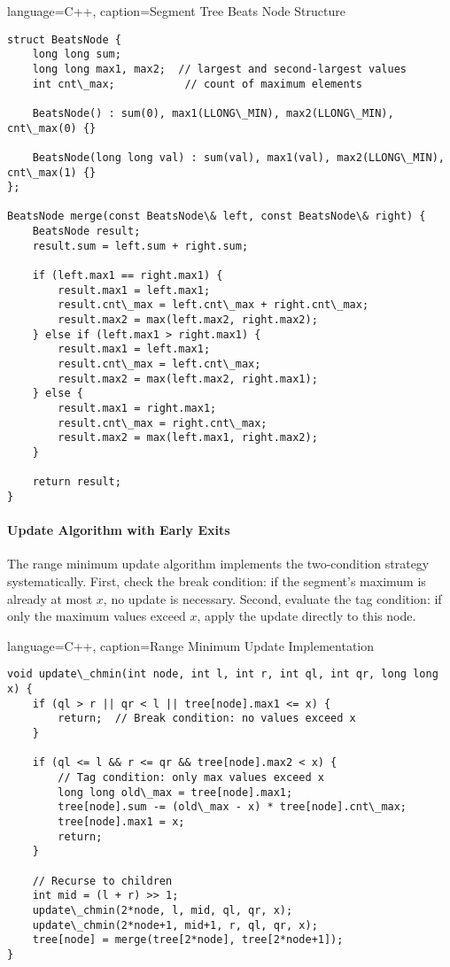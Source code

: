 \begin{marginlisting}[0pt]{language=C++, caption=Segment Tree Beats Node Structure}
\begin{lstlisting}
struct BeatsNode {
    long long sum;
    long long max1, max2;  // largest and second-largest values
    int cnt\_max;           // count of maximum elements
    
    BeatsNode() : sum(0), max1(LLONG\_MIN), max2(LLONG\_MIN), cnt\_max(0) {}
    
    BeatsNode(long long val) : sum(val), max1(val), max2(LLONG\_MIN), cnt\_max(1) {}
};

BeatsNode merge(const BeatsNode\& left, const BeatsNode\& right) {
    BeatsNode result;
    result.sum = left.sum + right.sum;
    
    if (left.max1 == right.max1) {
        result.max1 = left.max1;
        result.cnt\_max = left.cnt\_max + right.cnt\_max;
        result.max2 = max(left.max2, right.max2);
    } else if (left.max1 > right.max1) {
        result.max1 = left.max1;
        result.cnt\_max = left.cnt\_max;
        result.max2 = max(left.max2, right.max1);
    } else {
        result.max1 = right.max1;
        result.cnt\_max = right.cnt\_max;
        result.max2 = max(left.max1, right.max2);
    }
    
    return result;
}
\end{lstlisting}
\end{marginlisting}

\paragraph{Update Algorithm with Early Exits}

The range minimum update algorithm implements the two-condition strategy systematically. First, check the break condition: if the segment's maximum is already at most $x$, no update is necessary. Second, evaluate the tag condition: if only the maximum values exceed $x$, apply the update directly to this node.

\begin{marginlisting}[0pt]{language=C++, caption=Range Minimum Update Implementation}
\begin{lstlisting}
void update\_chmin(int node, int l, int r, int ql, int qr, long long x) {
    if (ql > r || qr < l || tree[node].max1 <= x) {
        return;  // Break condition: no values exceed x
    }
    
    if (ql <= l && r <= qr && tree[node].max2 < x) {
        // Tag condition: only max values exceed x
        long long old\_max = tree[node].max1;
        tree[node].sum -= (old\_max - x) * tree[node].cnt\_max;
        tree[node].max1 = x;
        return;
    }
    
    // Recurse to children
    int mid = (l + r) >> 1;
    update\_chmin(2*node, l, mid, ql, qr, x);
    update\_chmin(2*node+1, mid+1, r, ql, qr, x);
    tree[node] = merge(tree[2*node], tree[2*node+1]);
}
\end{lstlisting}
\end{marginlisting}

